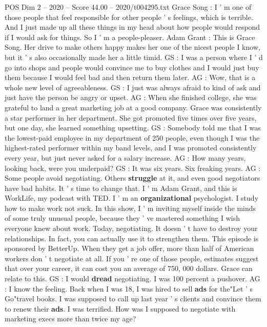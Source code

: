 \begin{textsample}{POS Dim 2 – 2020 – Score 44.00 – 2020/t004295.txt}  \label{ex:f2_pos_007}
Grace Song : I ' m one of those people that feel responsible for other people ' s feelings, which is terrible.
And I just made up all these things in my head about how people would respond if I would ask for things.
So I ' m a people-pleaser.
Adam Grant : This is Grace Song.
Her drive to make others happy makes her one of the nicest people I know, but it ' s also occasionally made her a little timid.
GS : I was a person where I ' d go into shops and people would convince me to buy clothes and I would just buy them because I would feel bad and then return them later.
AG : Wow, that is a whole new level of agreeableness.
GS : I just was always afraid to kind of ask and just have the person be angry or upset.
AG : When she finished college, she was grateful to land a great marketing job at a good company.
Grace was consistently a star performer in her department.
She got promoted five times over five years, but one day, she learned something upsetting.
GS : Somebody told me that I was the lowest-paid employee in my department of 250 people, even though I was the highest-rated performer within my band levels, and I was promoted consistently every year, but just never asked for a salary increase.
AG : How many years, looking back, were you underpaid?
GS : It was six years.
Six freaking years.
AG : Some people avoid negotiating.
Others \textbf{struggle} at it, and even good negotiators have bad habits.
It ' s time to change that.
I ' m Adam Grant, and this is WorkLife, my podcast with TED.
I ' m an \textbf{organizational} psychologist.
I study how to make work not suck.
In this show, I ' m inviting myself inside the minds of some truly unusual people, because they ' ve mastered something I wish everyone knew about work.
Today, negotiating.
It doesn ' t have to destroy your relationships.
In fact, you can actually use it to strengthen them.
This episode is sponsored by BetterUp.
When they get a job offer, more than half of American workers don ' t negotiate at all.
If you ' re one of those people, estimates suggest that over your career, it can cost you an average of 750, 000 dollars.
Grace can relate to this.
GS : I would \textbf{dread} negotiating.
I was 100 percent a pushover.
AG : I know the feeling.
Back when I was 18, I was hired to sell \textbf{ads} for the"Let ' s Go"travel books.
I was supposed to call up last year ' s clients and convince them to renew their \textbf{ads}.
I was terrified.
How was I supposed to negotiate with marketing execs more than twice my age?

\end{textsample}
